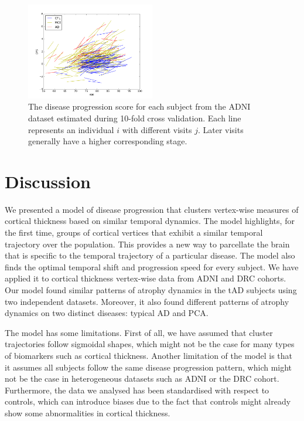 \begin{figure}[h]
    \centering
    \includegraphics[width=0.5\textwidth]{images/vwdpm/crossvalid/stagingConsist_adniThavgFWHM0Initk-meansCl3Pr0Ra1_VWDPMMean.png}
    \caption{The disease progression score for each subject from the ADNI dataset estimated during 10-fold cross validation. Each line represents an individual $i$ with different visits $j$. Later visits generally have a higher corresponding stage.}
    \label{fig:stagingConsist}
\end{figure}

\section{Discussion}
\label{sec:vwdpm_discussion}

We presented a model of disease progression that clusters vertex-wise measures of cortical thickness based on similar temporal dynamics. The model highlights, for the first time, groups of cortical vertices that exhibit a similar temporal trajectory over the population. This provides a new way to parcellate the brain that is specific to the temporal trajectory of a particular disease. The model also finds the optimal temporal shift and progression speed for every subject. We have applied it to cortical thickness vertex-wise data from ADNI and DRC cohorts. Our model found similar patterns of atrophy dynamics in the tAD subjects using two independent datasets. Moreover, it also found different patterns of atrophy dynamics on two distinct diseases: typical AD and PCA. 

The model has some limitations. First of all, we have assumed that cluster trajectories follow sigmoidal shapes, which might not be the case for many types of biomarkers such as cortical thickness. Another limitation of the model is that it assumes all subjects follow the same disease progression pattern, which might not be the case in heterogeneous datasets such as ADNI or the DRC cohort. Furthermore, the data we analysed has been standardised with respect to controls, which can introduce biases due to the fact that controls might already show some abnormalities in cortical thickness.

